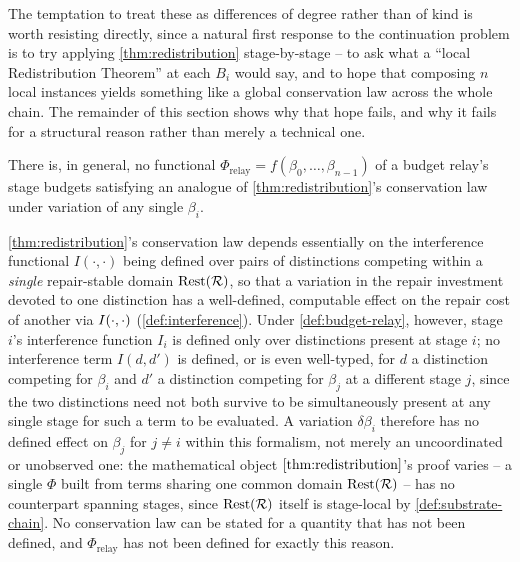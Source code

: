 The temptation to treat these as differences of degree rather than of
kind is worth resisting directly, since a natural first response to the
continuation problem is to try applying \cref{thm:redistribution}
stage-by-stage -- to ask what a ``local Redistribution Theorem'' at each
$B_i$ would say, and to hope that composing $n$ local instances yields
something like a global conservation law across the whole chain. The
remainder of this section shows why that hope fails, and why it fails for
a structural reason rather than merely a technical one.

\begin{proposition}
\label{prop:no-global-conserved-quantity}
There is, in general, no functional $\Phi_{\mathrm{relay}} =
f(\beta_0, \ldots, \beta_{n-1})$ of a budget relay's stage budgets
satisfying an analogue of \cref{thm:redistribution}'s conservation law
under variation of any single $\beta_i$.
\end{proposition}

\begin{proofsketch}
\cref{thm:redistribution}'s conservation law depends essentially on the
interference functional $I(\cdot,\cdot)$ being defined over pairs of
distinctions competing within a \emph{single} repair-stable domain
$\mathrm{Rest}(\mathcal{R})$, so that a variation in the repair investment devoted to
one distinction has a well-defined, computable effect on the repair cost
of another via $I(\cdot,\cdot)$ (\cref{def:interference}). Under
\cref{def:budget-relay}, however, stage $i$'s interference function $I_i$
is defined only over distinctions present at stage $i$; no interference
term $I(d, d')$ is defined, or is even well-typed, for $d$ a distinction
competing for $\beta_i$ and $d'$ a distinction competing for $\beta_j$ at
a different stage $j$, since the two distinctions need not both survive
to be simultaneously present at any single stage for such a term to be
evaluated. A variation $\delta\beta_i$ therefore has no defined effect on
$\beta_j$ for $j \neq i$ within this formalism, not merely an
uncoordinated or unobserved one: the mathematical object
$\cref{thm:redistribution}$'s proof varies -- a single $\Phi$ built from
terms sharing one common domain $\mathrm{Rest}(\mathcal{R})$ -- has no counterpart
spanning stages, since $\mathrm{Rest}(\mathcal{R})$ itself is stage-local by
\cref{def:substrate-chain}. No conservation law can be stated for a
quantity that has not been defined, and $\Phi_{\mathrm{relay}}$ has not
been defined for exactly this reason.
\end{proofsketch}

